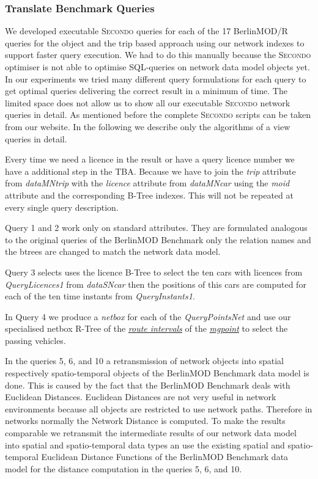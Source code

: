 \documentclass[a4paper]{article}
\newcommand{\secondo}{\textsc{Secondo}}
\newcommand{\bmodb} {BerlinMOD Benchmark}
\newcommand{\var}[1]{\textsl{#1}}
\newcommand{\dt}[1]{\textsl{\underline{#1}}}
\begin{document}
{\subsubsection{Translate Benchmark Queries}
\label{sec:queries}
We developed executable \secondo{} queries for each of the 17 BerlinMOD/R queries for the object and the trip based approach using our network indexes to support faster query execution. We had to do this manually because the \secondo{} optimiser is not able to optimise SQL-queries on network data model objects yet. In our experiments we tried many different query formulations for each query to get optimal queries delivering the correct result in a minimum of time. The limited space does not allow us to show all our executable \secondo{} network queries in detail. As mentioned before the complete \secondo{} scripts can be taken from our website. In the following we describe only the algorithms of a view queries in detail.

Every time we need a licence in the result or have a query licence number we have a additional step in the TBA. Because we have to join the \var{trip} attribute from \var{dataMNtrip} with the \var{licence} attribute from \var{dataMNcar} using the \var{moid} attribute and the corresponding B-Tree indexes. This will not be repeated at every single query description.

Query 1 and 2 work only on standard attributes. They are formulated analogous to the original queries of the \bmodb{} only the relation names and the btrees are changed to match the network data model.

Query 3 selects uses the licence B-Tree to select the ten cars with licences from \var{QueryLicences1} from \var{dataSNcar} then the positions of this cars are computed for each of the ten time instants from \var{QueryInstants1}.

In Query 4 we produce a \var{netbox} for each of the \var{QueryPointsNet} and use our specialised netbox R-Tree of the \dt{route intervals} of the \dt{mgpoint} to select the passing vehicles.

In the queries 5, 6, and 10 a retransmission of network objects into spatial respectively spatio-temporal objects of the \bmodb{} data model is done. This is caused by the fact that the \bmodb{} deals with Euclidean Distances. Euclidean Distances are not very useful in network environments because all objects are restricted to use network paths. Therefore in networks normally the Network Distance is computed. To make the results comparable we retransmit the intermediate results of our network data model into spatial and spatio-temporal data types an use the existing spatial and spatio-temporal Euclidean Distance Functions of the \bmodb{} data model for the distance computation in the queries 5, 6, and 10. 

}
\end{document}
